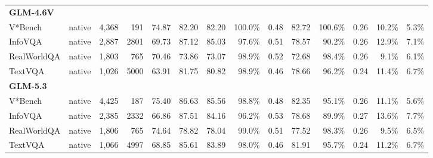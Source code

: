 \begin{table}[t]
\begin{tabular}{llrrrrrrrrrrrr}
\midrule
\multicolumn{10}{l}{\textbf{GLM-4.6V}} \\
V*Bench & native & 4,368 & 191 & 74.87 & 82.20 & 82.20 & 100.0\% & 0.48 & 82.72 & 100.6\% & 0.26 & 10.2\% & 5.3\% \\
InfoVQA & native & 2,887 & 2801 & 69.73 & 87.12 & 85.03 & 97.6\% & 0.51 & 78.57 & 90.2\% & 0.26 & 12.9\% & 7.1\% \\
RealWorldQA & native & 1,803 & 765 & 70.46 & 73.86 & 73.07 & 98.9\% & 0.52 & 72.68 & 98.4\% & 0.26 & 9.1\% & 6.1\% \\
TextVQA & native & 1,026 & 5000 & 63.91 & 81.75 & 80.82 & 98.9\% & 0.46 & 78.66 & 96.2\% & 0.24 & 11.4\% & 6.7\% \\
\midrule
\multicolumn{10}{l}{\textbf{GLM-5.3}} \\
V*Bench & native & 4,425 & 187 & 75.40 & 86.63 & 85.56 & 98.8\% & 0.48 & 82.35 & 95.1\% & 0.26 & 11.1\% & 5.6\% \\
InfoVQA & native & 2,385 & 2332 & 66.86 & 87.51 & 84.16 & 96.2\% & 0.53 & 78.68 & 89.9\% & 0.27 & 13.6\% & 7.7\% \\
RealWorldQA & native & 1,806 & 765 & 74.64 & 78.82 & 78.04 & 99.0\% & 0.51 & 77.52 & 98.3\% & 0.26 & 9.5\% & 6.5\% \\
TextVQA & native & 1,066 & 4997 & 68.85 & 85.61 & 83.89 & 98.0\% & 0.46 & 81.91 & 95.7\% & 0.24 & 11.2\% & 6.7\% \\
\bottomrule
\end{tabular}
\end{table}
